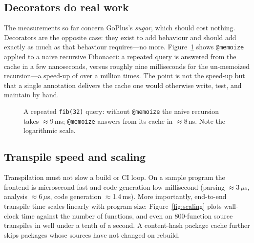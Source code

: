 \documentclass[11pt,a4paper]{article}
\begin{document}
\subsection{Decorators do real work}
The measurements so far concern GoPlus's \emph{sugar}, which should cost nothing.
Decorators are the opposite case: they exist to add behaviour and should add
exactly as much as that behaviour requires---no more. Figure~\ref{fig:memoize}
shows \texttt{@memoize} applied to a naive recursive Fibonacci: a repeated query
is answered from the cache in a few nanoseconds, versus roughly nine milliseconds
for the un-memoized recursion---a speed-up of over a million times. The point is
not the speed-up but that a single annotation delivers the cache one would
otherwise write, test, and maintain by hand.

\begin{figure}[ht]
\centering
{}
\caption{A repeated \texttt{fib(32)} query: without \texttt{@memoize} the naive
recursion takes \(\approx\)9\,ms; \texttt{@memoize} answers from its cache in
\(\approx\)8\,ns. Note the logarithmic scale.}
\label{fig:memoize}
\end{figure}

\subsection{Transpile speed and scaling}
Transpilation must not slow a build or CI loop. On a sample program the frontend
is microsecond-fast and code generation low-millisecond (parsing
\(\approx\)3\,\(\mu\)s, analysis \(\approx\)6\,\(\mu\)s, code generation
\(\approx\)1.4\,ms). More importantly, end-to-end transpile time scales linearly
with program size: Figure~\ref{fig:scaling} plots wall-clock time against the
number of functions, and even an 800-function source transpiles in well under a
tenth of a second. A content-hash package cache further skips packages whose
sources have not changed on rebuild.
\end{document}

